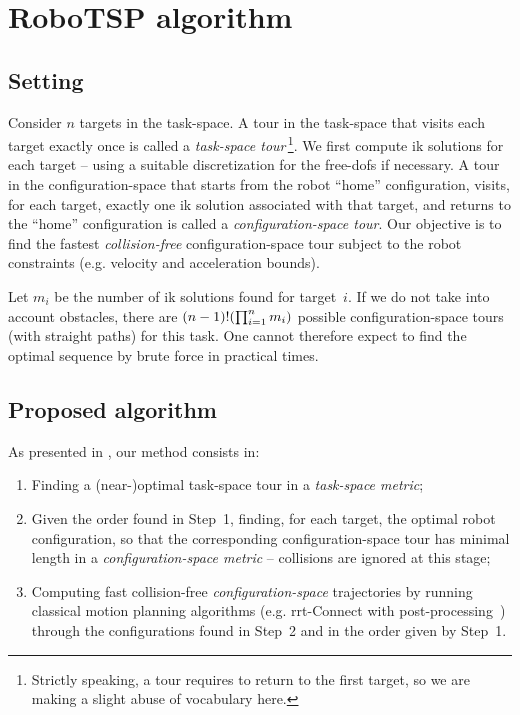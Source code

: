 \section{RoboTSP algorithm}
\label{sec:method}

\subsection{Setting}

Consider $n$ targets in the task-space. A tour in the task-space that visits
each target exactly once is called a \emph{task-space tour}\,\footnote{Strictly
speaking, a tour requires to return to the first target, so we are making a
slight abuse of vocabulary here.}. We first compute \ac{ik} solutions for each
target -- using a suitable discretization for the free-\acp{dof} if necessary. A
tour in the configuration-space that starts from the robot \enquote{home}
configuration, visits, for each target, exactly one \ac{ik} solution associated
with that target, and returns to the \enquote{home} configuration is called a
\emph{configuration-space tour}. Our objective is to find the fastest
\emph{collision-free} configuration-space tour subject to the robot constraints
(e.g. velocity and acceleration bounds).

Let $m_i$ be the number of \ac{ik} solutions found for target~$i$.  If we do not
take into account obstacles, there are $\qty(n-1)!\qty(\prod_{i=1}^{n} m_{i})$
possible configuration-space tours (with straight paths) for this task. One
cannot therefore expect to find the optimal sequence by brute force in practical
times.

\subsection{Proposed algorithm}

As presented in , our method consists in:

\begin{enumerate}

  \item Finding a (near-)optimal task-space tour in a \emph{task-space metric};

  \item Given the order found in Step~1, finding, for each target, the optimal
  robot configuration, so that the corresponding configuration-space tour has
  minimal length in a \emph{configuration-space metric} -- collisions are
  ignored at this stage;

  \item Computing fast collision-free \textit{configuration-space} trajectories
  by running classical motion planning algorithms (e.g. \ac{rrt}-Connect with
  post-processing~\cite{Kuffner2000a,Pham2015}) through the configurations found
  in Step~2 and in the order given by Step~1.

\end{enumerate}

